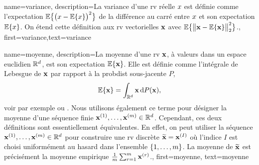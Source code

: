 {
	name={variance},
	description={La variance d’une \gls{rv} réelle $x$ est définie comme l’\gls{expectation} 
		$\mathbb{E}\big\{ \big( x - \mathbb{E}\{x \} \big)^{2} \big\}$ de la différence au carré entre $x$ 
		et son \gls{expectation} $\mathbb{E}\{x \}$. On étend cette définition aux \gls{rv} vectorielles ${\bf x}$ 
		avec $\mathbb{E}\big\{ \big\| {\bf x} - \mathbb{E}\{{\bf x} \} \big\|_{2}^{2} \big\}$.},
	first={variance},text={variance} 
}

{name={moyenne},
	description={La  moyenne d’une \gls{rv} ${\bf x}$, à valeurs dans un espace euclidien $\mathbb{R}^{d}$, est son 
		\gls{expectation} $\mathbb{E}\{{\bf x}\}$. Elle est définie comme l'intégrale de Lebesgue 
		de ${\bf x}$ par rapport à la \gls{probdist} sous-jacente $P$,
		\[
		\mathbb{E}\{{\bf x}\} = \int_{\mathbb{R}^{d}} {\bf x} \, \mathrm{d}P({\bf x}),
		\]
		voir par exemple \cite{BillingsleyProbMeasure} ou \cite{RudinBookPrinciplesMatheAnalysis}. 
		Nous utilisons également ce terme pour désigner la moyenne d’une séquence finie 
		${\bf x}^{(1)}, \ldots, {\bf x}^{(m)} \in \mathbb{R}^{d}$. Cependant, 
		ces deux définitions sont essentiellement équivalentes. En effet, on peut utiliser la séquence 
		${\bf x}^{(1)}, \ldots, {\bf x}^{(m)} \in \mathbb{R}^{d}$ pour construire une 
		\gls{rv} discrète $\widetilde{{\bf x}}={\bf x}^{(I)}$ où l’indice $I$ est choisi uniformément 
		au hasard dans l’ensemble $\{1,\ldots,m\}$. La moyenne de $\widetilde{{\bf x}}$ est 
		précisément la moyenne empirique $\frac{1}{m} \sum_{r=1}^{m} {\bf x}^{(r)}$.},
	first={moyenne}, text={moyenne}
}

